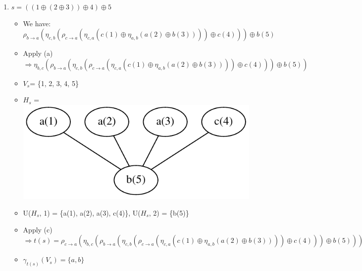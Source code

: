 \documentclass[a4paper, 12pt]{article}
\begin{document}
\begin{enumerate}
\item $s=((1\oplus(2\oplus3))\oplus4)\oplus5$
\begin{itemize}
\item We have: $\rho_{b\rightarrow a}(\eta_{c,b}(\rho_{c\rightarrow a}(\eta_{c,a}(c(1)\oplus\eta_{a,b}(a(2)\oplus b(3))))\oplus c(4)))\oplus b(5)$
\item Apply (a) $\Longrightarrow\eta_{b,c}(\rho_{b\rightarrow a}(\eta_{c,b}(\rho_{c\rightarrow a}(\eta_{c,a}(c(1)\oplus\eta_{a,b}(a(2)\oplus b(3))))\oplus c(4)))\oplus b(5))$
\item {$V_s$}= \{1, 2, 3, 4, 5\} 
\item {$H_s$} = \includegraphics[scale=0.5]{image/example6}
\item U({$H_s$}, 1) = \{a(1), a(2), a(3), c(4)\}, U({$H_s$},
2) = \{b(5)\} 
\item Apply (c) $\Longrightarrow t(s)=\rho_{c\rightarrow a}(\eta_{b,c}(\rho_{b\rightarrow a}(\eta_{c,b}(\rho_{c\rightarrow a}(\eta_{c,a}(c(1)\oplus\eta_{a,b}(a(2)\oplus b(3))))\oplus c(4)))\oplus b(5)))$ 
\item $\gamma_{t(s)}(V_{s})=\{a,b\}$ 
\end{itemize}


\end{enumerate}
\end{document}
